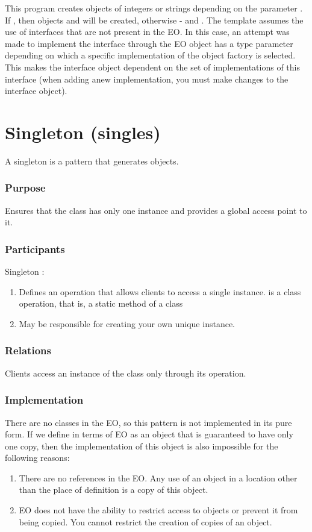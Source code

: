 \documentclass[12pt]{book}
\begin{document}
{{This program creates objects of integers or strings depending on the  parameter \ff{[0]}. If  , then objects  and  will be created, otherwise -    and  .
The template assumes the use of interfaces that are not present in the  EO. In this case, an attempt was made to implement the interface through the EO  object has a type parameter depending on which a specific implementation of the object factory is selected. This makes the interface object dependent on the set of implementations of this interface (when adding anew implementation, you must make changes to the interface object).

\section{Singleton (singles)}
A singleton is a pattern that generates objects.

\subsubsection{Purpose}
Ensures that the class has only one instance and provides a global access point to it.

\subsubsection{Participants}
Singleton :
\begin{enumerate}
    \item Defines an  operation that allows clients to access a single instance.  is a class operation,  that is,  a static method of a class
    \item May be responsible for creating your own unique instance.
\end{enumerate}

\subsubsection{Relations}
Clients access an instance of the  class only through its  operation.

\subsubsection{Implementation}
There are no classes in the EO, so this pattern is not implemented in its pure form. If we define  in  terms  of  EO as an object that is guaranteed to have only one copy, then the implementation of this object is also impossible for the following reasons:
\begin{enumerate}
    \item There are no references in the EO.  Any use of an object in a location other than the place of definition is a copy of this object.
    \item EO  does not have the ability to restrict access to objects or prevent it from being copied. You cannot restrict the creation of copies of an object.


\end{enumerate}}}
\end{document}
